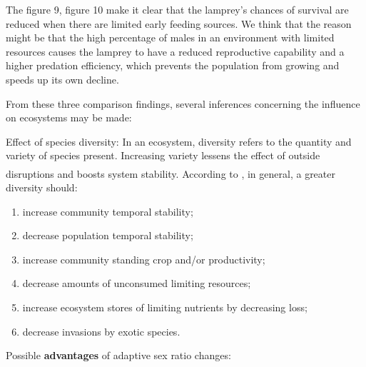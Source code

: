 \documentclass[12pt]{article}  %
\newcommand{\upcite}[1]{\textsuperscript{\textsuperscript{\cite{#1}}}}
\begin{document}
The figure 9, figure 10 make it clear that the lamprey's chances of survival are reduced when there are limited early feeding sources. We think that the reason might be that the high percentage of males in an environment with limited resources causes the lamprey to have a reduced reproductive capability and a higher predation efficiency, which prevents the population from growing and speeds up its own decline.



 From these three comparison findings, several inferences concerning the influence on ecosystems may be made:\par
 Effect of species diversity: In an ecosystem, diversity refers to the quantity and variety of species present. Increasing variety lessens the effect of outside disruptions and boosts system stability. According to \upcite{4}, in general, a greater diversity should: 
 \begin{enumerate}[\bfseries (1).]
 	\item increase community temporal stability; 
 	\item decrease population temporal stability;
 	\item increase community standing crop and/or productivity;
 	\item decrease amounts of unconsumed limiting resources;
 	\item increase ecosystem stores of limiting nutrients by decreasing loss; 
 	\item decrease invasions by exotic species.
 \end{enumerate}
\par
 Possible \textbf{advantages} of adaptive sex ratio changes:\par
\end{document}
